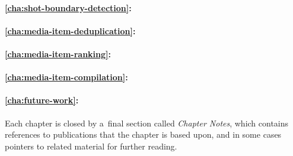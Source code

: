 \paragraph{\autoref{cha:shot-boundary-detection}:}
\paragraph{\autoref{cha:media-item-deduplication}:}
\paragraph{\autoref{cha:media-item-ranking}:}
\paragraph{\autoref{cha:media-item-compilation}:}
\paragraph{\autoref{cha:future-work}:}

Each chapter is closed by a~final section called
\emph{Chapter Notes}, which contains references to publications
that the chapter is based upon,
and in some cases pointers to related material for further reading.


\clearpage

